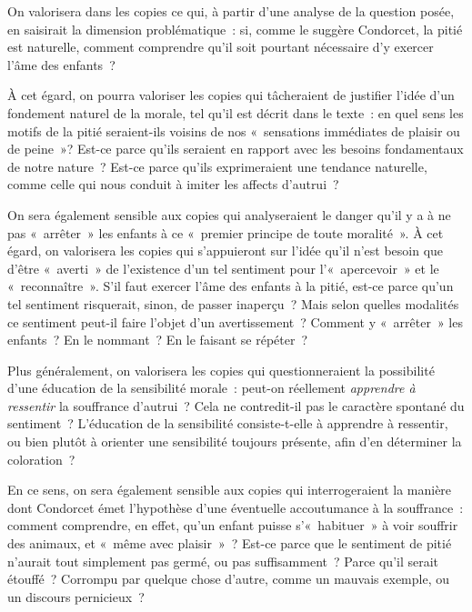		{On valorisera dans les copies ce qui, à partir d'une analyse de la question posée, en
saisirait la dimension problématique~: si, comme le suggère Condorcet, la pitié est
naturelle, comment comprendre qu'il soit pourtant nécessaire d'y exercer l'âme des
enfants~?

À cet égard, on pourra valoriser les copies qui tâcheraient de justifier l'idée d'un
fondement naturel de la morale, tel qu'il est décrit dans le texte~: en quel sens les motifs
de la pitié seraient-ils voisins de nos «~sensations immédiates de plaisir ou de peine~»?
Est-ce parce qu'ils seraient en rapport avec les besoins fondamentaux de notre
nature~? Est-ce parce qu'ils exprimeraient une tendance naturelle, comme celle qui
nous conduit à imiter les affects d'autrui~?

On sera également sensible aux copies qui analyseraient le danger qu'il y a à
ne pas «~arrêter~» les enfants à ce «~premier principe de toute moralité~». À cet égard,
on valorisera les copies qui s'appuieront sur l'idée qu'il n'est besoin que d'être
«~averti~» de l'existence d'un tel sentiment pour l'«~apercevoir~» et le «~reconnaître~».
S'il faut exercer l'âme des enfants à la pitié, est-ce parce qu'un tel sentiment risquerait,
sinon, de passer inaperçu~? Mais selon quelles modalités ce sentiment peut-il faire
l'objet d'un avertissement~? Comment y «~arrêter~» les enfants~? En le nommant~? En
le faisant se répéter~?

Plus généralement, on valorisera les copies qui questionneraient la possibilité
d'une éducation de la sensibilité morale~: peut-on réellement \emph{apprendre à ressentir} la
souffrance d'autrui~? Cela ne contredit-il pas le caractère spontané du sentiment~?
L'éducation de la sensibilité consiste-t-elle à apprendre à ressentir, ou bien plutôt à
orienter une sensibilité toujours présente, afin d'en déterminer la coloration~?

En ce sens, on sera également sensible aux copies qui interrogeraient la
manière dont Condorcet émet l'hypothèse d'une éventuelle accoutumance à la
souffrance~: comment comprendre, en effet, qu'un enfant puisse s'«~habituer~» à voir
souffrir des animaux, et «~même avec plaisir~»~? Est-ce parce que le sentiment de pitié
n'aurait tout simplement pas germé, ou pas suffisamment~? Parce qu'il serait étouffé~?
Corrompu par quelque chose d'autre, comme un mauvais exemple, ou un discours
pernicieux~?

}
